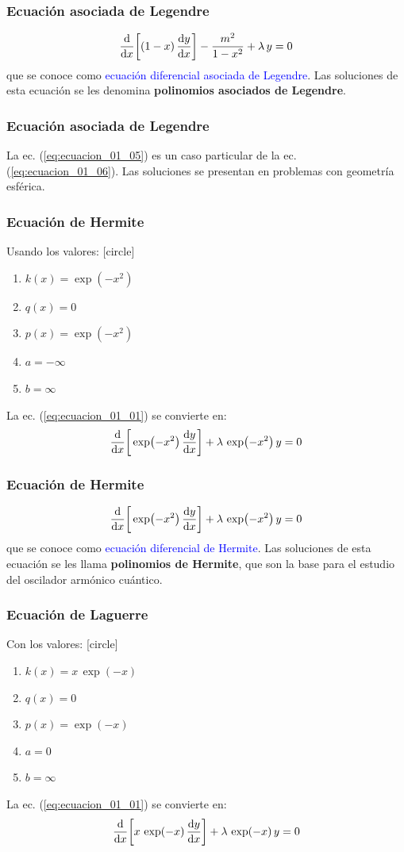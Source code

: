\documentclass[12pt]{beamer}
\begin{document}
\begin{frame}
\frametitle{Ecuación asociada de Legendre}
\begin{align*}
\dv{x} \bigg[ (1 - x) \, \dv{y}{x} \bigg] - \dfrac{m^{2}}{1 - x^{2}} + \lambda \, y = 0
\end{align*}
\pause
que se conoce como \textcolor{blue}{ecuación diferencial asociada de Legendre}. \pause Las soluciones de esta ecuación se les denomina \textbf{polinomios asociados de Legendre}.
\end{frame}
\begin{frame}
\frametitle{Ecuación asociada de Legendre}
La ec. (\ref{eq:ecuacion_01_05}) es un caso particular de la ec. (\ref{eq:ecuacion_01_06}). \pause Las soluciones se presentan en problemas con geometría esférica.
\end{frame}
\begin{frame}
\frametitle{Ecuación de Hermite}
Usando los valores:
[circle]
\begin{enumerate}[<+->]
\item $k(x) = \exp(-x^{2})$
\item $q(x) = 0$
\item $p(x) = \exp(-x^{2})$
\item $a = -\infty$
\item $b = \infty$
\end{enumerate}
\pause
La ec. (\ref{eq:ecuacion_01_01}) se convierte en:
\begin{align}
\dv{x} \bigg[ \exp(-x^{2}) \, \dv{y}{x} \bigg] + \lambda \, \exp(-x^{2}) \, y = 0
\label{eq:ecuacion_01_07}
\end{align}
\end{frame}
\begin{frame}
\frametitle{Ecuación de Hermite}
\begin{align*}
\dv{x} \bigg[ \exp(-x^{2}) \, \dv{y}{x} \bigg] + \lambda \, \exp(-x^{2}) \, y = 0
\end{align*}
\pause
que se conoce como \textcolor{blue}{ecuación diferencial de Hermite}. \pause Las soluciones de esta ecuación se les llama \textbf{polinomios de Hermite}, que son la base para el estudio del oscilador armónico cuántico.
\end{frame}
\begin{frame}
\frametitle{Ecuación de Laguerre}
Con los valores:
[circle]
\begin{enumerate}[<+->]
\item $k(x) = x \, \exp(-x)$
\item $q(x) = 0$
\item $p(x) = \exp(-x)$
\item $a = 0$
\item $b = \infty$
\end{enumerate}
\pause
La ec. (\ref{eq:ecuacion_01_01}) se convierte en:
\begin{align}
\dv{x} \bigg[ x \, \exp(-x) \, \dv{y}{x} \bigg] + \lambda \, \exp(-x) \, y = 0
\label{eq:ecuacion_01_08}
\end{align}
\end{frame}
\end{document}
